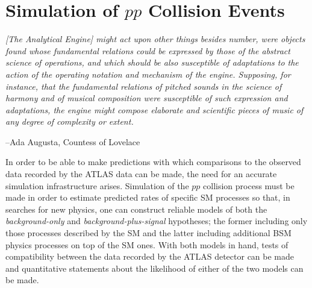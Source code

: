 \chapter{Simulation of $pp$ Collision Events}
\label{chap:simulation}


\epigraph{\textit{[The Analytical Engine] might act upon other things besides number, were objects found whose
fundamental relations could be expressed by those of the abstract science of operations, and which should be also susceptible
of adaptations to the action of the operating notation and mechanism of the engine. Supposing, for instance, that the
fundamental relations of pitched sounds in the science of harmony and of musical composition were susceptible of such
expression and adaptations, the engine might compose elaborate and scientific pieces of music of any degree of
complexity or extent.}}{--Ada Augusta, Countess of Lovelace}


In order to be able to make predictions with which comparisons to the observed data
recorded by the ATLAS data can be made, the need for an accurate simulation infrastructure
arises.
Simulation of the $pp$ collision process must be made in order to estimate predicted
rates of specific SM processes so that, in searches for new physics, one can
construct reliable models of both the \textit{background-only} and \textit{background-plus-signal}
hypotheses; the former including only those processes described by the SM and the latter
including additional BSM physics processes on top of the SM ones.
With both models in hand, tests of compatibility between the data recorded by the ATLAS detector
can be made and quantitative statements about the likelihood of either of the two models can be made.

